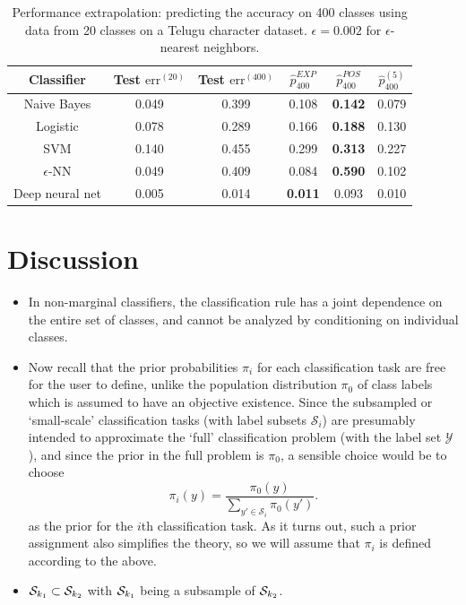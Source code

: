 \documentclass[12pt]{article}
\begin{document}
\begin{table}
\centering
\begin{tabular}{|c||c|c|c|c|c|}\hline
Classifier      & Test $\text{err}^{(20)}$ & Test $\text{err}^{(400)}$ & $\hat{p}^{EXP}_{400}$ & $\hat{p}^{POS}_{400}$ & $\hat{p}^{(5)}_{400}$\\ \hline
Naive Bayes     & 0.049                   & 0.399                   & 0.108              & \textbf{0.142}      & 0.079             \\ \hline
Logistic        & 0.078                   & 0.289                   & 0.166              & \textbf{0.188}      & 0.130             \\ \hline
SVM             & 0.140                   & 0.455                   & 0.299              & \textbf{0.313}      & 0.227             \\ \hline
$\epsilon$-NN   & 0.049                   & 0.409                   & 0.084              & \textbf{0.590}      & 0.102             \\ \hline
Deep neural net & 0.005                   & 0.014                   & \textbf{0.011}     & 0.093               & 0.010             \\ \hline
\end{tabular}
\caption{Performance extrapolation: predicting the accuracy on 400 classes using data from 20 classes on a Telugu character dataset.
$\epsilon = 0.002$ for $\epsilon$-nearest neighbors.}
\end{table}

\section{Discussion}

\begin{itemize}
\item In non-marginal classifiers, the classification rule has
a joint dependence on the entire set of classes, and cannot be
analyzed by conditioning on individual classes.
\item Now recall that the prior probabilities $\pi_i$ for each
classification task are free for the user to define, unlike the
population distribution $\pi_0$ of class labels which is assumed to
have an objective existence.  Since the subsampled or `small-scale'
classification tasks (with label subsets $\mathcal{S}_i$) are
presumably intended to approximate the `full' classification problem
(with the label set $\mathcal{Y}$), and since the prior in the full
problem is $\pi_0$, a sensible choice would be to choose
\[
\pi_i(y) = \frac{\pi_0(y)}{\sum_{y' \in \mathcal{S}_i} \pi_0(y')}.
\]
as the prior for the $i$th classification task.  As it turns out, such
a prior assignment also simplifies the theory, so we will assume that
$\pi_i$ is defined according to the above.
\item $\mathcal{S}_{k_1} \subset
\mathcal{S}_{k_2}$ with $\mathcal{S}_{k_1}$ being a subsample of
$\mathcal{S}_{k_2}$.
\end{itemize}
\end{document}
